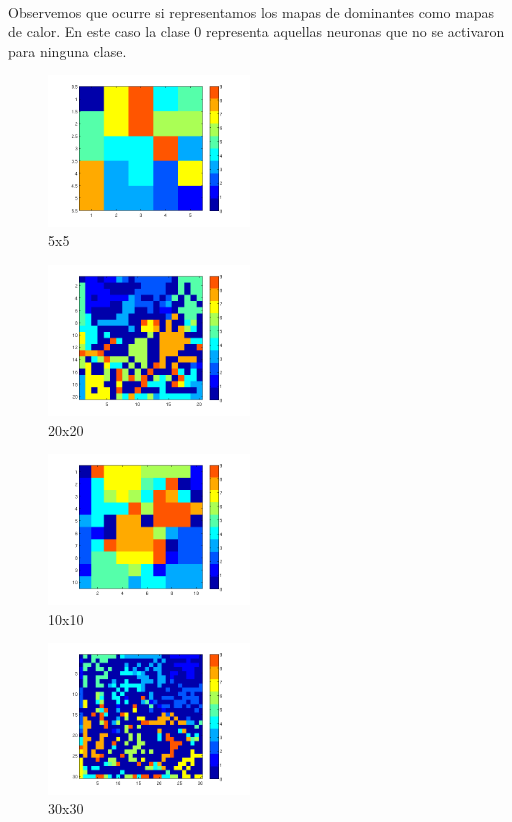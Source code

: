 \documentclass[informe.tex]{subfiles}
\begin{document}
	~
	
	Observemos que ocurre si representamos los mapas de dominantes como mapas de calor. En este caso la clase 0 representa aquellas neuronas que no se activaron para ninguna clase.
	
       
       \begin{minipage}{0.30\textwidth}
	 \centering
	 \begin{figure}[H]
	  \centering
	    \includegraphics[height=4cm,keepaspectratio]{graficos/calor/calor_5x5.png}
		  \caption{\small 5x5}
	 \end{figure}
	 \begin{figure}[H]
	  \centering
	    \includegraphics[height=4cm,keepaspectratio]{graficos/calor/calor_20x20.png}
		  \caption{\small 20x20}
	 \end{figure}
       \end{minipage}
       \begin{minipage}{0.33\textwidth}
	 \centering
	 \begin{figure}[H]
	  \centering
	    \includegraphics[height=4cm,keepaspectratio]{graficos/calor/calor_10x10.png}
		  \caption{\small 10x10}
	 \end{figure}
	 \begin{figure}[H]
	  \centering
	    \includegraphics[height=4cm,keepaspectratio]{graficos/calor/calor_30x30.png}
		  \caption{\small 30x30}
	 \end{figure}
       \end{minipage}
\end{document}
